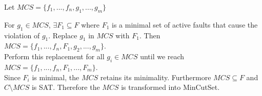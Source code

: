 Let $MCS = \{f_1,...,f_n,g_1,...,g_m\}$

For $g_1 \in MCS$, $\exists F_1 \subseteq F$ where $F_1$ is a minimal set of active faults that cause the violation of $g_1$.  Replace $g_1$ in $MCS$ with $F_1$. Then $MCS = \{f_1,...,f_n, F_1,g_2,...,g_m\}$. \\

Perform this replacement for all $g_i \in MCS$ until we reach $MCS = \{f_1,...,f_n,F_1,...,F_m\}$. \\

Since $F_i$ is minimal, the $MCS$ retains its minimality. Furthermore $MCS \subseteq F$ and $C\setminus MCS$ is SAT. Therefore the $MCS$ is transformed into MinCutSet. 








































